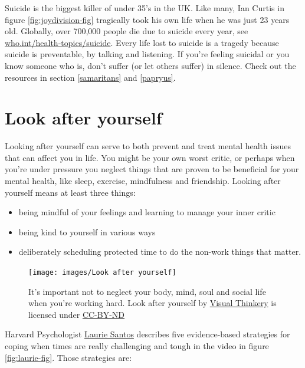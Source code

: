 \documentclass[
]{book}
\providecommand{\tightlist}{%
  \setlength{\itemsep}{0pt}\setlength{\parskip}{0pt}}
\begin{document}
Suicide is the biggest killer of under 35's in the UK. Like many, Ian Curtis in figure \ref{fig:joydivision-fig} tragically took his own life when he was just 23 years old. Globally, over 700,000 people die due to suicide every year, see \href{https://www.who.int/health-topics/suicide}{who.int/health-topics/suicide}. Every life lost to suicide is a tragedy because suicide is preventable, by talking and listening. If you're feeling suicidal or you know someone who is, don't suffer (or let others suffer) in silence. Check out the resources in section \ref{samaritans} and \ref{papryus}.

\hypertarget{lays}{%
\section{Look after yourself}\label{lays}}

Looking after yourself can serve to both prevent and treat mental health issues that can affect you in life. You might be your own worst critic, or perhaps when you're under pressure you neglect things that are proven to be beneficial for your mental health, like sleep, exercise, mindfulness and friendship. Looking after yourself means at least three things:

\begin{itemize}
\tightlist
\item
  being mindful of your feelings and learning to manage your inner critic
\item
  being kind to yourself in various ways
\item
  deliberately scheduling protected time to do the non-work things that matter.
\end{itemize}

\begin{figure}

{\centering \texttt{[image: images/Look after yourself]} 

}

\caption{It's important not to neglect your body, mind, soul and social life when you're working hard. Look after yourself by \href{https://visualthinkery.com}{Visual Thinkery} is licensed under \href{https://creativecommons.org/licenses/by-nd/4.0/}{CC-BY-ND}}\label{fig:lookafter-fig}
\end{figure}



Harvard Psychologist \href{https://en.wikipedia.org/wiki/Laurie_R._Santos}{Laurie Santos} describes five evidence-based strategies for coping when times are really challenging and tough in the video in figure \ref{fig:laurie-fig}. Those strategies are:
\end{document}
